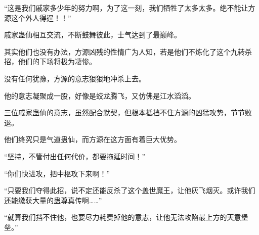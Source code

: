 \begin{this_body}
“这是我们戚家多少年的努力啊，为了这一刻，我们牺牲了太多太多。绝不能让方源这个外人得逞！！”

戚家蛊仙相互交流，不断鼓舞彼此，士气达到了最巅峰。

其实他们也没有办法，方源凶残的性情广为人知，若是他们不炼化了这个九转杀招，他们的下场将极为凄惨。

没有任何犹豫，方源的意志狠狠地冲杀上去。

他的意志凝聚成一股，好像是蛟龙腾飞，又仿佛是江水滔滔。

三位戚家蛊仙的意志，虽然配合默契，但根本抵挡不住方源的凶猛攻势，节节败退。

他们终究只是气道蛊仙，而方源在这方面有着巨大优势。

“坚持，不管付出任何代价，都要拖延时间！”

“你们快进攻，把中枢攻下来啊！”

“只要我们夺得此招，说不定还能反杀了这个盖世魔王，让他灰飞烟灭。或许我们还能缴获大量的蛊尊真传啊……”

“就算我们挡不住他，也要尽力耗费掉他的意志，让他无法攻陷最上方的天意堡垒。”

\end{this_body}

